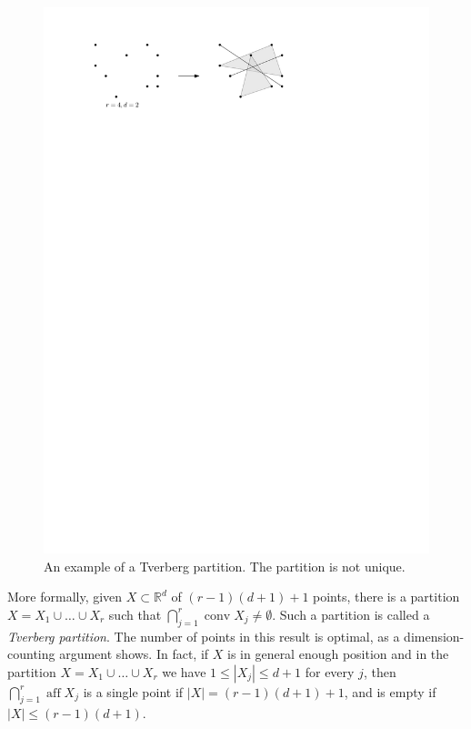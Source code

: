 \documentclass[11pt]{article}
\newcommand{\rr}{\mathbb{R}}
\DeclareMathOperator{\conv}{conv}
\DeclareMathOperator{\aff}{aff}
\begin{document}
	\begin{figure}
		\centerline{\includegraphics[scale=1]{fig1-Tverberg}}
		\caption{An example of a Tverberg partition.  The partition is not unique.}
	\end{figure}
	
	More formally, given $X\subset \rr^d$ of $(r-1)(d+1)+1$ points, there is a partition $X=X_1\cup \dots \cup X_r$ such that $\bigcap_{j=1}^r \conv X_j \ne \emptyset$. Such a partition is called a
	\textit{Tverberg partition}. The number of points in this result is optimal, as a dimension-counting argument shows. In fact, if $X$ is in general enough position and in the partition $X=X_1\cup \ldots \cup X_r$ we have $1\le |X_j|\le d+1$ for every $j$, then $\bigcap_{j=1}^r \aff X_j$ is a single point if $|X|= (r-1)(d+1)+1$, and is empty if $|X|\le (r-1)(d+1)$.
	
	
\end{document}
